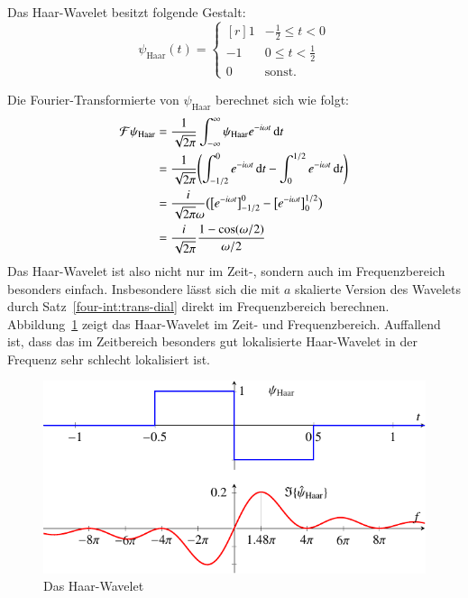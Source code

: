 \begin{definition}
	\label{complex:def-haar-wavelet}
	Das Haar-Wavelet besitzt folgende Gestalt:
	\[
	\psi_{\text{Haar}}(t) = \left\lbrace\begin{matrix*}[r]
	1 & -\frac{1}{2} \le t < 0  \\
	-1 & 0 \le t < \frac{1}{2} \\
	0 & \text{sonst}.
	\end{matrix*} \right.\label{complex:def-haar}
	\]
\end{definition}
Die Fourier-Transformierte von $\psi_{\text{Haar}}$ berechnet sich wie folgt:
\begin{align}
	\Four \psi_\text{Haar}  
	&= \frac{1}{\sqrt{2\pi}}\int_{-\infty}^{\infty} \psi_\text{Haar} e^{-i\omega t} \,\mathrm{d}t\nonumber\\
	&= \frac{1}{\sqrt{2\pi}}\Biggl( \int_{-1/2}^{0} e^{-i\omega t} \,\mathrm{d}t - \int_{0}^{1/2} e^{-i\omega t}\,\mathrm{d}t \Biggr) \nonumber\\
	&= \frac{i}{\sqrt{2\pi}\omega}\bigl( \bigl[ e^{-i\omega t}\bigr]_{-1/2}^0  - \bigl[ e^{-i\omega t}\bigr]_{0}^{1/2} \bigr)\nonumber\\
	&= \frac{i}{\sqrt{2\pi}} \frac{1-\cos(\omega/2)}{\omega/2}\label{complex:f-psi-haar}
\end{align}
Das Haar-Wavelet ist also nicht nur im Zeit-, sondern auch im Frequenzbereich besonders einfach.
Insbesondere lässt sich die mit $a$ skalierte Version des Wavelets durch Satz~\ref{four-int:trans-dial} direkt im Frequenzbereich berechnen.
Abbildung~\ref{complex:haar} zeigt das Haar-Wavelet im Zeit- und Frequenzbereich.
Auffallend ist, dass das im Zeitbereich besonders gut lokalisierte Haar-Wavelet in der Frequenz sehr schlecht lokalisiert ist.
\begin{figure}
	\centering
	\includegraphics{papers/complex/images/haar.pdf}
	\caption{Das Haar-Wavelet}
	\label{complex:haar}
\end{figure}

